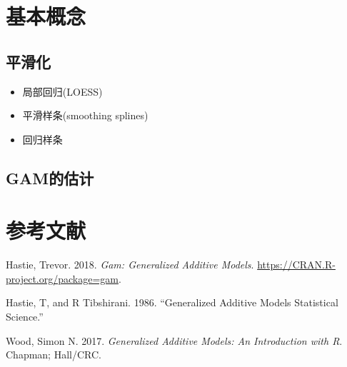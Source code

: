 \documentclass[]{ctexart}
\providecommand{\tightlist}{%
  \setlength{\itemsep}{0pt}\setlength{\parskip}{0pt}}
\begin{document}
\hypertarget{section-1}{%
\section{基本概念}\label{section-1}}

\hypertarget{section-2}{%
\subsection{平滑化}\label{section-2}}

\begin{itemize}
\tightlist
\item
  局部回归(LOESS)
\item
  平滑样条(smoothing splines)
\item
  回归样条
\end{itemize}

\hypertarget{gam-3}{%
\subsection{GAM的估计}\label{gam-3}}

\clearpage

\hypertarget{section-3}{%
\section*{参考文献}\label{section-3}}

\hypertarget{refs}{}
\leavevmode\hypertarget{ref-Rgam}{}%
Hastie, Trevor. 2018. \emph{Gam: Generalized Additive Models}.
\url{https://CRAN.R-project.org/package=gam}.

\leavevmode\hypertarget{ref-hastie1986generalized}{}%
Hastie, T, and R Tibshirani. 1986. ``Generalized Additive Models
Statistical Science.''

\leavevmode\hypertarget{ref-wood2017generalized}{}%
Wood, Simon N. 2017. \emph{Generalized Additive Models: An Introduction
with R}. Chapman; Hall/CRC.
\end{document}
